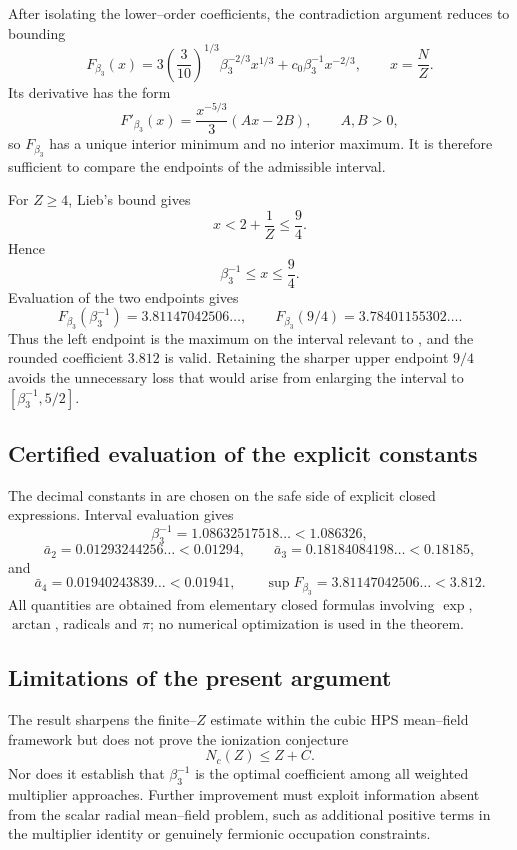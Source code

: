 After isolating the lower--order coefficients, the contradiction argument reduces to bounding
\[
 F_{\beta_3}(x)
 =
 3\left(\frac3{10}\right)^{1/3}\beta_3^{-2/3}x^{1/3}
 +c_0\beta_3^{-1}x^{-2/3},
 \qquad x=\frac NZ.
\]
Its derivative has the form
\[
 F'_{\beta_3}(x)
 =\frac{x^{-5/3}}{3}(Ax-2B),
 \qquad A,B>0,
\]
so $F_{\beta_3}$ has a unique interior minimum and no interior maximum.  It is therefore sufficient to compare the endpoints of the admissible interval.

For $Z\ge4$, Lieb's bound gives
\[
 x<2+\frac1Z\le\frac94.
\]
Hence
\[
 \beta_3^{-1}\le x\le\frac94.
\]
Evaluation of the two endpoints gives
\[
 F_{\beta_3}(\beta_3^{-1})
 =3.81147042506\ldots,
 \qquad
 F_{\beta_3}(9/4)
 =3.78401155302\ldots.
\]
Thus the left endpoint is the maximum on the interval relevant to , and the rounded coefficient $3.812$ is valid.  Retaining the sharper upper endpoint $9/4$ avoids the unnecessary loss that would arise from enlarging the interval to $[\beta_3^{-1},5/2]$.

\subsection{Certified evaluation of the explicit constants}

The decimal constants in  are chosen on the safe side of explicit closed expressions.  Interval evaluation gives
\[
 \beta_3^{-1}=1.08632517518\ldots<1.086326,
\]
\[
 \bar a_2=0.01293244256\ldots<0.01294,\qquad
 \bar a_3=0.18184084198\ldots<0.18185,
\]
and
\[
 \bar a_4=0.01940243839\ldots<0.01941,
 \qquad
 \sup F_{\beta_3}=3.81147042506\ldots<3.812.
\]
All quantities are obtained from elementary closed formulas involving $\exp$, $\arctan$, radicals and $\pi$; no numerical optimization is used in the theorem.

\subsection{Limitations of the present argument}

The result sharpens the finite--$Z$ estimate within the cubic HPS mean--field framework but does not prove the ionization conjecture
\[
 N_c(Z)\le Z+C.
\]
Nor does it establish that $\beta_3^{-1}$ is the optimal coefficient among all weighted multiplier approaches.  Further improvement must exploit information absent from the scalar radial mean--field problem, such as additional positive terms in the multiplier identity or genuinely fermionic occupation constraints.
